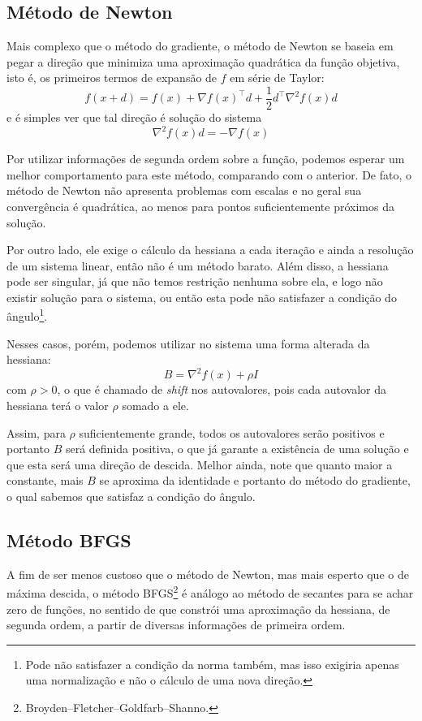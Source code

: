 \documentclass[a4paper,11pt]{article}
\begin{document}
        \subsection*{Método de Newton}
            Mais complexo que o método do gradiente, o método de Newton se baseia em pegar a direção que minimiza uma aproximação quadrática da função objetiva,
            isto é, os primeiros termos de expansão de $f$ em série de Taylor:
                $$ f(x + d) = f(x) + \nabla f(x)^\top d + \frac{1}{2}d^\top\nabla^2f(x)d $$
            e é simples ver que tal direção é solução do sistema
                $$ \nabla^2 f(x)d = -\nabla f(x)$$

            Por utilizar informações de segunda ordem sobre a função, podemos esperar um melhor comportamento para este método, comparando com o anterior.
            De fato, o método de Newton não apresenta problemas com escalas e no geral sua convergência é quadrática, ao menos para pontos suficientemente
            próximos da solução.

            Por outro lado, ele exige o cálculo da hessiana a cada iteração e ainda a resolução de um sistema linear, então não é um método barato.
            Além disso, a hessiana pode ser singular, já que não temos restrição nenhuma sobre ela, e logo não existir solução para o sistema,
            ou então esta pode não satisfazer a condição do ângulo\footnote{Pode não satisfazer a condição da norma também, mas isso exigiria apenas uma normalização e não o cálculo de uma nova direção.}.

            Nesses casos, porém, podemos utilizar no sistema uma forma alterada da hessiana:
                $$ B = \nabla^2 f(x) + \rho I $$
            com $\rho > 0$, o que é chamado de \emph{shift} nos autovalores, pois cada autovalor da hessiana terá o valor $\rho$ somado a ele.

            Assim, para $\rho$ suficientemente grande, todos os autovalores serão positivos e portanto $B$ será definida positiva, o que já garante
            a existência de uma solução e que esta será uma direção de descida. Melhor ainda, note que quanto maior a constante, mais $B$ se aproxima
            da identidade e portanto do método do gradiente, o qual sabemos que satisfaz a condição do ângulo.

        \subsection*{Método BFGS}
            A fim de ser menos custoso que o método de Newton, mas mais esperto que o de máxima descida, o método BFGS\footnote{Broyden–Fletcher–Goldfarb–Shanno.}
            é análogo ao método de secantes para se achar zero de funções, no sentido de que constrói uma aproximação da hessiana, de segunda ordem, a partir
            de diversas informações de primeira ordem.
\end{document}
